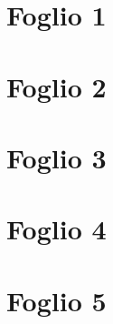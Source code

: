 \documentclass{article}
\begin{document}
\tableofcontents

\newpage

\section{Foglio 1}


\section{Foglio 2}


\section{Foglio 3}


\section{Foglio 4}


\section{Foglio 5}

\end{document}
